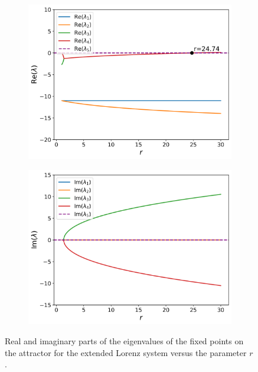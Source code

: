 \documentclass[paper=a4, fontsize=11pt]{scrartcl}
\numberwithin{equation}{section}		%
\numberwithin{figure}{section}			%
\numberwithin{table}{section}				%
\begin{document}
\begin{figure}[hbt!]
	\centering
	
	\begin{subfigure}[b]{0.49\textwidth}
		\centering
		\includegraphics[width=\textwidth]{media/extendedhopf_eigs_real.png}
		\caption{}
		\label{fig:sub1}
	\end{subfigure}
	\hfill
	\begin{subfigure}[b]{0.49\textwidth}
		\centering
		\includegraphics[width=\textwidth]{media/extendedhopf_eigs_imag.png}
		\caption{}
		\label{fig:sub2}
	\end{subfigure}
	
	\caption{Real and imaginary parts of the eigenvalues of the fixed points on the attractor for the extended Lorenz system versus the parameter $r$.}
	\label{fig:exthopf_eigs}
\end{figure}
\end{document}
